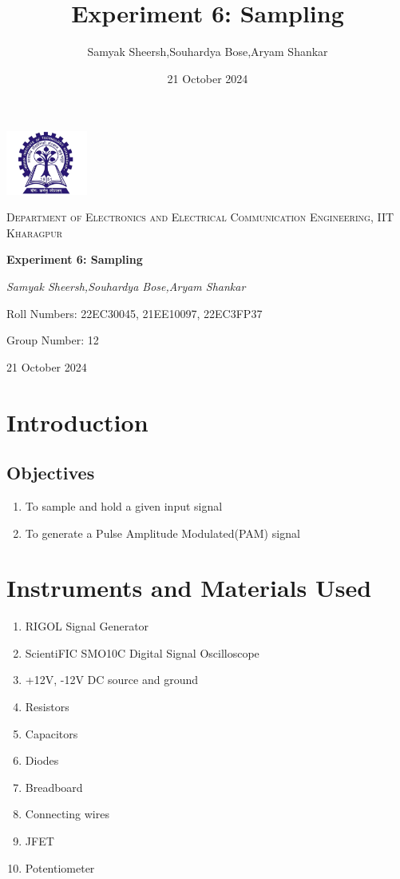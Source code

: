 \documentclass{article}
\title{Experiment 6: Sampling}
\author{Samyak Sheersh,Souhardya Bose,Aryam Shankar}
\date{21 October 2024}
\begin{document}
\begin{titlepage}
    \centering
    \includegraphics[width=0.2\textwidth]{KGP_logo.png}\par\vspace{1cm}
    {\scshape\LARGE Department of Electronics and Electrical Communication Engineering, IIT Kharagpur\par}
    \vspace{1cm}
    {\huge\bfseries Experiment 6: Sampling\par}
    \vspace{1.5cm}
    {\Large\itshape Samyak Sheersh,Souhardya Bose,Aryam Shankar\par}
    \vfill
    {\large Roll Numbers: 22EC30045, 21EE10097, 22EC3FP37\par}
    {\large Group Number: 12\par}
    \vfill
    {\large 21 October 2024\par}
\end{titlepage}


\section{Introduction}
\subsection{Objectives}
\begin{enumerate}
  \item To sample and hold a given input signal
  \item To generate a Pulse Amplitude Modulated(PAM) signal
\end{enumerate}
\section{Instruments and Materials Used}
\begin{enumerate}
  \item RIGOL Signal Generator
  \item ScientiFIC SMO10C Digital Signal Oscilloscope
  \item +12V, -12V DC source and ground
  \item Resistors
  \item Capacitors
  \item Diodes
  \item Breadboard
  \item Connecting wires
  \item JFET
  \item Potentiometer
\end{enumerate}
\end{document}
